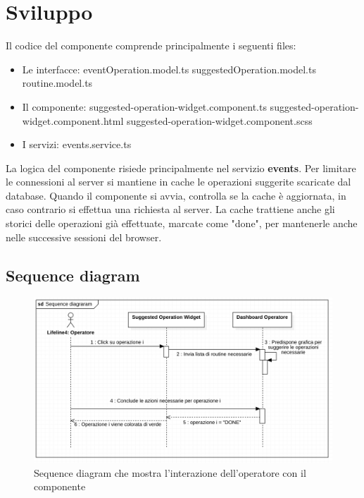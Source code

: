 \section{Sviluppo}
Il codice del componente comprende principalmente i seguenti files:
\begin{itemize}
    \item Le interfacce:
    \subitem eventOperation.model.ts
    \subitem suggestedOperation.model.ts
    \subitem routine.model.ts
\end{itemize}

\begin{itemize}
    \item Il componente:
    \subitem suggested-operation-widget.component.ts
    \subitem suggested-operation-widget.component.html
    \subitem suggested-operation-widget.component.scss
\end{itemize}

\begin{itemize}
    \item I servizi:
    \subitem events.service.ts
 \end{itemize}

 La logica del componente risiede principalmente nel servizio \textbf{events}.
 Per limitare le connessioni al server si mantiene in cache le operazioni suggerite scaricate dal database.
 Quando il componente si avvia, controlla se la cache è aggiornata, in caso contrario si effettua una richiesta
 al server.
 La cache trattiene anche gli storici delle operazioni già effettuate, marcate come "done", 
 per mantenerle anche nelle successive sessioni del browser.



\subsection{Sequence diagram}

\begin{figure}[H]
    \centering
    \includegraphics[width=150mm]{img/sequence}
    \caption{Sequence diagram che mostra l'interazione dell'operatore con il componente}
  \end{figure}


